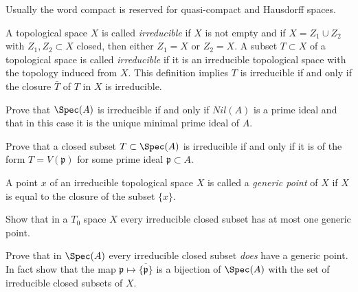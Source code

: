 \begin{remark}
\label{remark-not-hausdorff}
Usually the word compact is reserved for quasi-compact and
Hausdorff spaces.
\end{remark}

\begin{definition}
\label{definition-irreducible}
A topological space $X$ is called {\it irreducible} if $X$ is not empty
and if $X = Z_1\cup Z_2$ with $Z_1, Z_2\subset X$ closed, then either
$Z_1 = X$ or $Z_2 = X$. A subset $T\subset X$ of a topological space
is called {\it irreducible} if it is an irreducible
topological space with the topology induced from $X$.
This definition implies $T$ is irreducible if and only
if the closure $\bar T$ of $T$ in $X$ is irreducible.
\end{definition}

\begin{exercise}
\label{exercise-irreducible-spec}
Prove that $\Spec(A)$ is irreducible if and only if
$Nil(A)$ is a prime ideal and that in this case it is the unique
minimal prime ideal of $A$.
\end{exercise}

\begin{exercise}
\label{exercise-irreducible-prime}
Prove that a closed subset $T\subset \Spec(A)$
is irreducible if and only if it is of the form $T = V({\mathfrak p})$ for
some prime ideal ${\mathfrak p}\subset A$.
\end{exercise}

\begin{definition}
\label{definition-generic-point}
A point $x$ of an irreducible topological space $X$ is called
a {\it generic point} of $X$ if $X$ is equal to the closure of
the subset $\{x\}$.
\end{definition}

\begin{exercise}
\label{exercise-irreducible-T0-at-most-one-generic}
Show that in a $T_0$ space $X$ every irreducible closed
subset has at most one generic point.
\end{exercise}

\begin{exercise}
\label{exercise-spec-sober}
Prove that in $\Spec(A)$ every
irreducible closed subset {\it does} have a generic point.
In fact show that the map
${\mathfrak p} \mapsto \overline{\{{\mathfrak p}\}}$ is
a bijection of $\Spec(A)$ with the set of irreducible closed
subsets of $X$.
\end{exercise}

